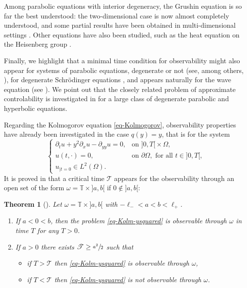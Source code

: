 \documentclass[10pt]{amsart}
\let\mathcal\mathscr
\theoremstyle{plain}
\newtheorem{theorem}{{Theorem}}[section]
\theoremstyle{definition}
\newcommand{\1}{\mathds 1}
\newcommand{\T}{\mathbb{T}}
\let\O\Omega
\newcommand{\Tc}{{\mathcal T}}
\begin{document}
Among parabolic equations with interior degeneracy, the Grushin equation is so far the best understood: the two-dimensional case is now
almost completely understood, and some partial results have been obtained in multi-dimensional settings \cite{Beauchard_Cannarsa_Guglielmi,Beauchard_Miller_Morancey,Koenig17,Lissy19,Beauchard_Darde_Ervedoza,Duprez_Koenig,Allonsius_Boyer_Morancey}. Other equations have also been studied, such as the heat equation on the Heisenberg group \cite{Beauchard_Cannarsa}.

Finally, we highlight that a minimal time condition for observability might also appear for systems of parabolic equations, degenerate or not (see, among others, \cite{AmmarKhodja_Benabdallah_GonzalesBurgos_deTeresa,Duprez,Benabdallah_Boyer_Morancey}),
for degenerate Schrödinger equations \cite{Burq_Sun_19,LetrouitSun20}, and appears naturally for the wave equation (see \cite{raucht74,bardoslr92}). We point out that the closely related problem of approximate controlability
is investigated in \cite{LaurentLeautaud18} for a large class of degenerate parabolic and hyperbolic equations.

Regarding the Kolmogorov equation \eqref{eq-Kolmogorov}, observability properties have already been investigated in the
case $q(y) = y$, that is for the system
\begin{equation} \label{eq-Kolm-ysquared}
\begin{cases}
\partial_t u + y^2 \partial_x u - \partial_{yy} u = 0, & \text{on } ]0,T[{}\times \O,\\
u(t,\cdot) = 0, & \text{on } \partial\O, \text{ for all } t \in{}]0,T[,\\
u_{|t=0} \in L^2 (\O).
\end{cases}
\end{equation}
It is proved in \cite{Beauchard14} that a critical time $\Tc$ appears for the observability through an open set of the form $\omega = \T\times{}]a,b[$ if $0 \notin{}]a,b[$:

\begin{theorem}[\cite{Beauchard14}] \label{th-KB}
Let $\omega = \T \times{}]a,b[$ with $-\ell_- < a < b< \ell_+$.
\begin{enumerate}
\item If $a < 0 < b$, then the problem \eqref{eq-Kolm-ysquared} is observable through $\omega$ in time $T$ for any $T>0$.
\item If $a > 0$ there exists $\Tc \geq \sfrac{a^2}{2}$ such that
\begin{itemize}
\item if $T > \Tc$ then \eqref{eq-Kolm-ysquared} is observable through $\omega$,
\item if $T < \Tc$ then \eqref{eq-Kolm-ysquared} is not observable through $\omega$.
\end{itemize}
\end{enumerate}
\end{theorem}
\end{document}
